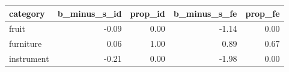 \begin{table}[ht]
\centering
\begin{tabular}{lrrrr}
  \hline
category & b\_minus\_s\_id & prop\_id & b\_minus\_s\_fe & prop\_fe \\ 
  \hline
fruit & -0.09 & 0.00 & -1.14 & 0.00 \\ 
  furniture & 0.06 & 1.00 & 0.89 & 0.67 \\ 
  instrument & -0.21 & 0.00 & -1.98 & 0.00 \\ 
   \hline
\end{tabular}
\end{table}
